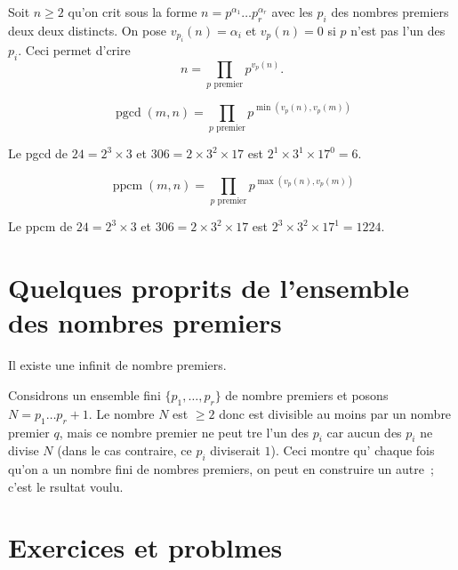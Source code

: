 \documentclass[a4paper,fleqn,openany]{trmbook}
\DeclareMathOperator{\pgcd}{pgcd}
\DeclareMathOperator{\ppcm}{ppcm}
\begin{document}
Soit $n \geq 2$ qu'on crit sous la forme $n = p^{\alpha_1} \dots p_r^{\alpha_r}$ avec les $p_i$ des nombres premiers deux  deux distincts. On pose $v_{p_i}(n) = \alpha_i$ et $v_p(n)=0$ si $p$ n'est pas l'un des $p_i$. Ceci permet d'crire
\[n = \prod_{\text{$p$ premier}}{p^{v_p(n)}}.\]

\begin{corollaire}
\[\pgcd(m,n) = \prod_{\text{$p$ premier}}{p^{\min(v_p(n),v_p(m))}}\]
\end{corollaire}

\begin{exemple}
Le pgcd de $24 = 2^3 \times 3$ et $306 = 2 \times 3^2 \times 17$ est $2^1 \times 3^1 \times 17^0 = 6$.
\end{exemple}

\begin{corollaire}
\[\ppcm(m,n) = \prod_{\text{$p$ premier}}{p^{\max(v_p(n),v_p(m))}}\]
\end{corollaire}

\begin{exemple}
Le ppcm de $24 = 2^3 \times 3$ et $306 = 2 \times 3^2 \times 17$ est $2^3 \times 3^2 \times 17^1 = 1224$.
\end{exemple}

\section{Quelques proprits de l'ensemble des nombres premiers}

\begin{theoreme}\label{theoreme:euclide}
Il existe une infinit de nombre premiers.
\end{theoreme}

\begin{demonstration}
Considrons un ensemble fini $\{p_1,\dots,p_r\}$ de nombre premiers et posons $N = p_1 \dots p_r + 1$. Le nombre $N$ est $\geq 2$ donc est divisible au moins par un nombre premier $q$, mais ce nombre premier ne peut tre l'un des $p_i$ car aucun des $p_i$ ne divise $N$ (dans le cas contraire, ce $p_i$ diviserait $1$). Ceci montre qu' chaque fois qu'on a un nombre fini de nombres premiers, on peut en construire un autre~; c'est le rsultat voulu.
\end{demonstration}


\modeexercice %
\section{Exercices et problmes}
\end{document}
